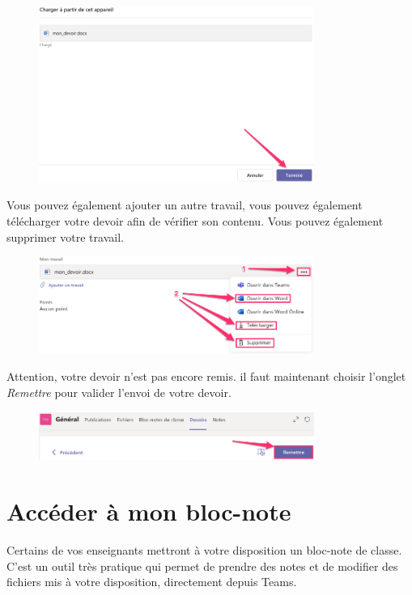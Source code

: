 \begin{figure}[H]
\includegraphics[width=9cm]{./images/teams/ajout2}
\centering
\end{figure}

Vous pouvez également ajouter un autre travail, vous pouvez également télécharger votre devoir afin de vérifier son contenu. Vous pouvez également supprimer votre travail.

\begin{figure}[H]
\includegraphics[width=9cm]{./images/teams/ajout3}
\centering
\end{figure}

Attention, votre devoir n'est pas encore remis. il faut maintenant choisir l'onglet \textit{Remettre} pour valider l'envoi de votre devoir. 

\begin{figure}[H]
\includegraphics[width=9cm]{./images/teams/ajout4}
\centering
\end{figure}


\section{Accéder à mon bloc-note}

Certains de vos enseignants mettront à votre disposition un bloc-note de classe. C'est un outil très pratique qui permet de prendre des notes et de modifier des fichiers mis à votre disposition, directement depuis Teams.\\

